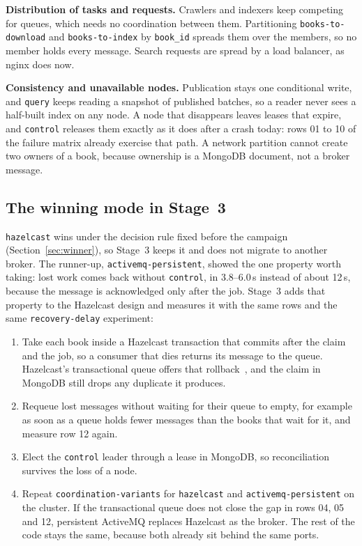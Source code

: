 \documentclass[11pt,a4paper]{article}
\newcommand{\code}[1]{\nolinkurl{#1}}
\newcommand{\mode}[1]{\code{#1}}
\begin{document}
\textbf{Distribution of tasks and requests.} Crawlers and indexers keep competing for queues, which needs no
coordination between them. Partitioning \code{books-to-download} and \code{books-to-index} by \code{book_id} spreads
them over the members, so no member holds every message. Search requests are spread by a load balancer, as nginx does
now.

\textbf{Consistency and unavailable nodes.} Publication stays one conditional write, and \code{query} keeps reading a
snapshot of published batches, so a reader never sees a half-built index on any node. A node that disappears leaves
leases that expire, and \code{control} releases them exactly as it does after a crash today: rows 01 to 10 of the
failure matrix already exercise that path. A network partition cannot create two owners of a book, because ownership
is a MongoDB document, not a broker message.

\subsection{The winning mode in Stage~3}

\mode{hazelcast} wins under the decision rule fixed before the campaign (Section~\ref{sec:winner}), so Stage~3 keeps it
and does not migrate to another broker. The runner-up, \mode{activemq-persistent}, showed the one property worth
taking: lost work comes back without \code{control}, in 3.8--6.0\,s instead of about 12\,s, because the message is
acknowledged only after the job. Stage~3 adds that property to the Hazelcast design and measures it with the same
rows and the same \code{recovery-delay} experiment:
\begin{enumerate}
\item Take each book inside a Hazelcast transaction that commits after the claim and the job, so a consumer that dies
  returns its message to the queue. Hazelcast's transactional queue offers that rollback~\cite{hazelcast}, and the claim in MongoDB
  still drops any duplicate it produces.
\item Requeue lost messages without waiting for their queue to empty, for example as soon as a queue holds fewer
  messages than the books that wait for it, and measure row 12 again.
\item Elect the \code{control} leader through a lease in MongoDB, so reconciliation survives the loss of a node.
\item Repeat \code{coordination-variants} for \mode{hazelcast} and \mode{activemq-persistent} on the cluster. If the
  transactional queue does not close the gap in rows 04, 05 and 12, persistent ActiveMQ replaces Hazelcast as the
  broker. The rest of the code stays the same, because both already sit behind the same ports.
\end{enumerate}
\end{document}
